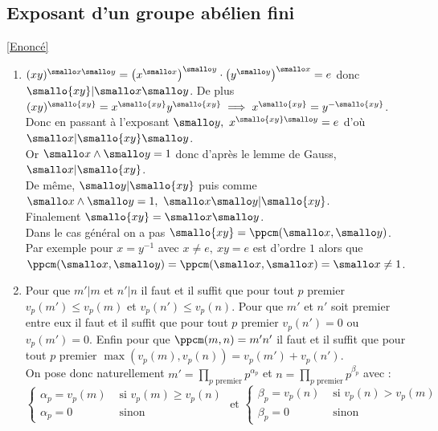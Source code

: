 \documentclass[8pt]{book}
\begin{document}
	\subsection{Exposant d'un groupe abélien fini }
	\label{Exposant d'un groupe abélien fini corrigé}
	\textcolor{blue}{\hyperref[Exposant d'un groupe abélien fini]{[Enoncé]}}\\
	\begin{enumerate}[leftmargin=*]
		\item $(xy)^{\smallo x\smallo y}=\left(x^{\smallo x}\right)^{\smallo y}\cdot\left(y^{\smallo y}\right)^{\smallo x}=e$ donc $\smallo{xy}|\smallo x\smallo y$. De plus $(xy)^{\smallo{xy}}=x^{\smallo{xy}}y^{\smallo{xy}}\implies x^{\smallo{xy}}=y^{-\smallo{xy}}$.\\
		Donc en passant à l'exposant $\smallo y,\ x^{\smallo{xy}\smallo y}=e$ d'où $\smallo x|\smallo{xy}\smallo y$.\\
		Or $\smallo x\land \smallo y=1$ donc d'après le lemme de Gauss, $\smallo x|\smallo{xy}$.\\
		De même, $\smallo y|\smallo{xy}$ puis comme $\smallo x\land \smallo y=1,\ \smallo x\smallo y|\smallo{xy}$.\\
		Finalement $\smallo{xy}=\smallo x\smallo y$.\\
		Dans le cas général on a pas $\smallo{xy}=\ppcm(\smallo x,\smallo y)$. Par exemple pour $x=y^{-1}$ avec $x\ne e,\ xy=e$ est d'ordre $1$ alors que $\ppcm(\smallo x,\smallo y)=\ppcm(\smallo x,\smallo x)=\smallo x\ne 1$.
		\item Pour que $m'|m$ et $n'|n$ il faut et il suffit que pour tout $p$ premier $v_p(m')\leq v_p(m)$ et $v_p(n')\leq v_p(n)$. Pour que $m'$ et $n'$ soit premier entre eux il faut et il suffit que pour tout $p$ premier $v_p(n')=0$ ou $v_p(m')=0$. Enfin pour que $\ppcm(m,n)=m'n'$ il faut et il suffit que pour tout $p$ premier $\max(v_p(m),v_p(n))=v_p(m')+v_p(n')$.\\
		On pose donc naturellement $m'=\displaystyle\prod\limits_{p\text{ premier}}p^{\alpha_p}$ et $n=\displaystyle\prod\limits_{p\text{ premier}}p^{\beta_p}$ avec :\\
		$$\begin{cases}
			\alpha_p=v_p(m)&\mbox{ si }v_p(m)\geq v_p(n)\\
			\alpha_p=0&\mbox{ sinon}
		\end{cases}
		\text{ et }
		\begin{cases}
			\beta_p=v_p(n)&\mbox{ si }v_p(n)>v_p(m)\\
			\beta_p=0&\mbox{ sinon}

\end{cases}$$
\end{enumerate}
\end{document}
